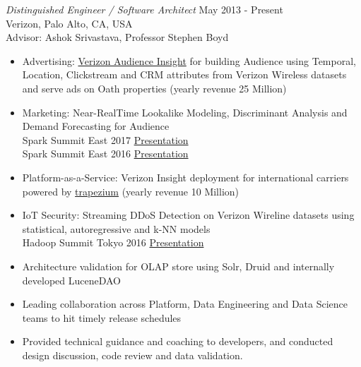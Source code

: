 \documentclass[margin]{res}
\begin{document}
\begin{resume}
{\sl Distinguished Engineer / Software Architect} \hfill May 2013 - Present\\
Verizon, Palo Alto, CA, USA\\
Advisor: Ashok Srivastava, Professor Stephen Boyd
\begin{itemize} \itemsep -2pt

\item Advertising: \href{https://verizoninsights.verizon.com} {Verizon
  Audience Insight} for building Audience using Temporal, Location,
  Clickstream and CRM attributes from Verizon Wireless datasets and 
  serve ads on Oath properties (yearly revenue 25 Million)

\item Marketing: Near-RealTime Lookalike Modeling, Discriminant Analysis and Demand Forecasting for Audience\\
Spark Summit East 2017 
\href{https://spark-summit.org/east-2017/events/realtime-analytical-query-processing-and-predictive-model-building-on-high-dimensional-document-datasets-with-timestamps}{Presentation}\\
Spark Summit East 2016 \href{http://www.slideshare.net/SparkSummit/spark-summit-eu-talk-by-debasish-das-and-pramod-narasimha-68928564}{Presentation}

\item Platform-as-a-Service: Verizon Insight deployment for international carriers powered by \href{https://github.com/Verizon/trapezium}{trapezium} (yearly revenue 10 Million)

\item IoT Security: Streaming DDoS Detection on Verizon Wireline datasets using statistical, autoregressive and k-NN models\\
Hadoop Summit Tokyo 2016 \href{http://www.slideshare.net/HadoopSummit/near-realtime-network-anomaly-detection-and-traffic-analysis-using-spark-based-lambda-architecture}{Presentation}

\item Architecture validation for OLAP store using Solr, Druid and internally developed LuceneDAO 

\item Leading collaboration across Platform, Data Engineering and Data Science teams to hit timely release schedules

\item Provided technical guidance and coaching to developers, and conducted design discussion, code review and data validation.


\end{itemize}
\end{resume}
\end{document}
